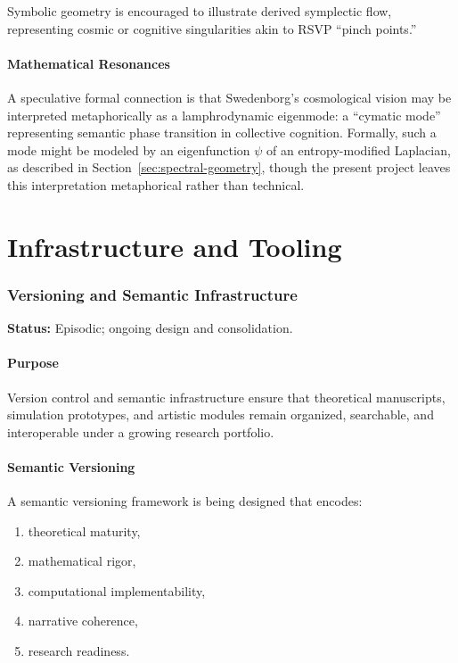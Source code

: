 \documentclass[12pt]{article}
\theoremstyle{plain}
\theoremstyle{definition}
\theoremstyle{remark}
\begin{document}
Symbolic geometry is encouraged to illustrate derived symplectic flow,
representing cosmic or cognitive singularities akin to RSVP ``pinch points.''


\subsection{Mathematical Resonances}

A speculative formal connection is that Swedenborg’s cosmological vision may be
interpreted metaphorically as a lamphrodynamic eigenmode: a ``cymatic mode''
representing semantic phase transition in collective cognition. Formally, such
a mode might be modeled by an eigenfunction $\psi$ of an entropy-modified
Laplacian, as described in Section~\ref{sec:spectral-geometry}, though the
present project leaves this interpretation metaphorical rather than technical.


\newpage


\part{Infrastructure and Tooling}


\section{Versioning and Semantic Infrastructure}

\textbf{Status:} Episodic; ongoing design and consolidation.

\subsection{Purpose}

Version control and semantic infrastructure ensure that theoretical manuscripts,
simulation prototypes, and artistic modules remain organized, searchable, and
interoperable under a growing research portfolio.


\subsection{Semantic Versioning}

A semantic versioning framework is being designed that encodes:
\begin{enumerate}
    \item theoretical maturity,
    \item mathematical rigor,
    \item computational implementability,
    \item narrative coherence,
    \item research readiness.
\end{enumerate}
\end{document}
